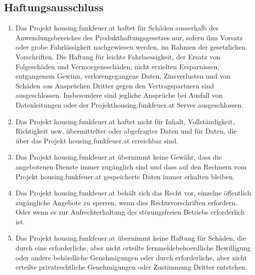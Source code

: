 \documentclass[parskip=half]{article}
\begin{document}
\subsection{ Haftungsausschluss}
\begin{enumerate}
\item Das Projekt housing.funkfeuer.at haftet für Schäden ausserhalb des
Anwendungsbereiches des Produkthaftungsgesetzes nur, sofern ihm Vorsatz oder grobe
Fahrlässigkeit nachgewiesen werden, im Rahmen der gesetzlichen Vorschriften. Die
Haftung für leichte Fahrlaessigkeit, der Ersatz von Folgeschäden und Vermoegensschäden, nicht erzielten Ersparnissen, entgangenem Gewinn, verlorengegangene Daten, Zinsverlusten und
von Schäden aus Ansprüchen Dritter gegen den Vertragspartnern sind ausgeschlossen. Insbesondere sind jegliche Ansprüche bei Ausfall von Datenleitungen oder der Projekthousing.funkfeuer.at Server ausgeschlossen.
\item Das Projekt housing.funkfeuer.at haftet nicht für Inhalt, Vollständigkeit, Richtigkeit usw.
übermittelter oder abgefragter Daten und für Daten, die über das Projekt
housing.funkfeuer.at erreichbar sind.
\item Das Projekt housing.funkfeuer.at übernimmt keine Gewähr, dass die angebotenen
Dienste immer zugänglich sind und dass auf den Rechnern vom Projekt
housing.funkfeuer.at gespeicherte Daten immer erhalten bleiben.
\item Das Projekt housing.funkfeuer.at behält sich das Recht vor, einzelne öffentlich
zugängliche Angebote zu sperren, wenn dies Rechtsvorschriften erfordern. Oder wenn es
zur Aufrechterhaltung des störungsfreien Betriebs erforderlich ist.
\item Das Projekt housing.funkfeuer.at übernimmt keine Haftung für Schäden, die durch
eine erforderliche, aber nicht erteilte fernmeldebehoerdliche Bewilligung oder andere
behördliche Genehmigungen oder durch erforderliche, aber nicht erteilte privatrechtliche
Genehmigungen oder Zustimmung Dritter entstehen.
\end{enumerate}
\end{document}
